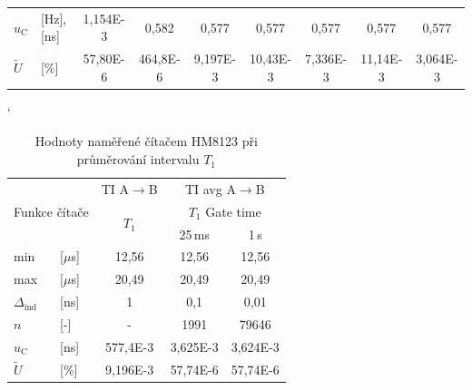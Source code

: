 \documentclass[a4paper, czech]{article}
\begin{document}
\begin{table}[H]
\begin{tabular}{ll|ccccccc}
        $u_\text{C}$               & [Hz], [ns]             & 1,154E-3           & 0,582              & 0,577               & 0,577               & 0,577               & 0,577               & 0,577               \\
        $\tilde{U}$                & [\%]                 & 57,80E-6          & 464,8E-6           & 9,197E-3            & 10,43E-3            & 7,336E-3            & 11,14E-3            & 3,064E-3            \\
        \bottomrule
    \end{tabular}
\end{table}

\begin{table}[H]
    \catcode`
    \centering
    \caption{Hodnoty naměřené čítačem HM8123 při průměrování intervalu $T_1$}
    \begin{tabular}{ll|ccc}
        \toprule
        \multicolumn{2}{c}{\multirow{3}{*}{Funkce čítače}}     & TI A$\rightarrow$B              & \multicolumn{2}{c}{TI avg A$\rightarrow$B}   \\
        \cmidrule(rl){3-3}
        \cmidrule(rl){4-5}
        \multicolumn{2}{c}{\multirow{2}{*}{}} & \multirow{2}{*}{$T_1$} & \multicolumn{2}{c}{$T_1$ Gate time} \\
        \cmidrule(rl){4-5}
        \multicolumn{2}{c}{}                  &                     & 25\,ms           & 1\,s            \\
        \cmidrule(rl){1-5}
        min                & [$\mu$s]               & 12,56               & 12,56           & 12,56          \\
        max                & [$\mu$s]               & 20,49               & 20,49           & 20,49          \\
        $\Delta_\text{ind}$               & [ns]               & 1                   & 0,1             & 0,01           \\
        $n$                  & [-]                & -                   & 1991            & 79646          \\
        $u_\text{C}$                 & [ns]               & 577,4E-3            & 3,625E-3        & 3,624E-3       \\
        $\tilde{U}$                  & [\%]               & 9,196E-3            & 57,74E-6        & 57,74E-6       \\
        \bottomrule
    \end{tabular}
\end{table}
\end{document}
